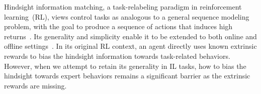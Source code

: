 







Hindsight information matching, a task-relabeling paradigm in reinforcement learning~(RL), views control tasks as analogous to a general sequence modeling problem, with the goal to produce a sequence of actions that induces high returns~\citep{chen2021decision}. Its generality and simplicity enable it to be extended to both online and offline settings~\citep{emmons2021rvs, kumar2019reward}. In its original RL context, an agent directly uses known extrinsic rewards to bias the hindsight information towards task-related behaviors. However, %
when we attempt to retain its generality in IL tasks, how to bias the hindsight towards expert behaviors remains a significant barrier as the extrinsic rewards are missing. 














